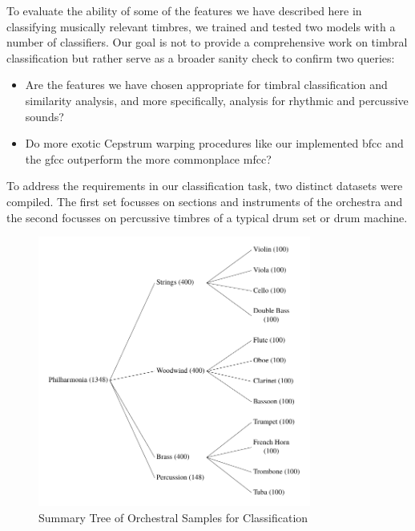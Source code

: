 {{{{To evaluate the ability of some of the features we have described here in classifying musically relevant timbres, we trained and tested two models with a number of classifiers. Our goal is not to provide a comprehensive work on timbral classification but rather serve as a broader sanity check to confirm two queries:

\begin{itemize}
  \item Are the features we have chosen appropriate for timbral classification and similarity analysis, and more specifically, analysis for rhythmic and percussive sounds?
  \item Do more exotic Cepstrum warping procedures like our implemented \acrshort{bfcc} and the \acrshort{gfcc} outperform the more commonplace \acrshort{mfcc}?
\end{itemize}

To address the requirements in our classification task, two distinct datasets were compiled. The first set focusses on sections and instruments of the orchestra and the second focusses on percussive timbres of a typical drum set or drum machine.

\begin{figure}
	\begin{center}
		\includegraphics[width=0.8\textwidth]{ch05_pyconcat/figures/orch_distribution.pdf}
	\end{center}
	\caption[Summary Tree of Orchestral Samples for Classification]{Summary Tree of Orchestral Samples for Classification}
	\label{fig:orch_distribution}
\end{figure}

}}}}
